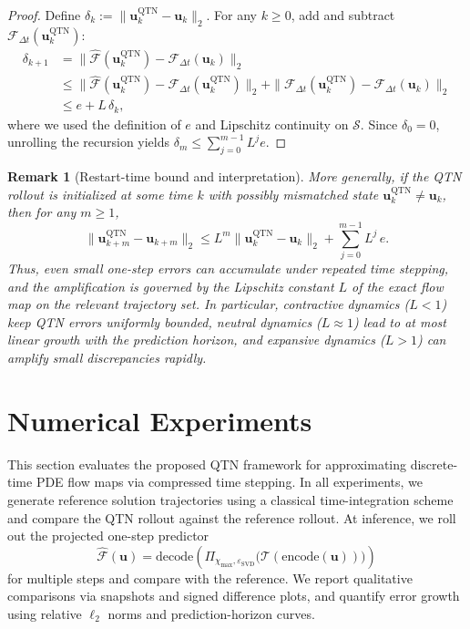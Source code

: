 \documentclass[letterpaper, 10 pt, conference]{ieeeconf}  %
\newtheorem{remark}{Remark}
\begin{document}
\begin{proof}
Define $\delta_k := \|\mathbf{u}_k^{\mathrm{QTN}} - \mathbf{u}_k\|_2$.
For any $k \ge 0$, add and subtract $\mathcal{F}_{\Delta t}(\mathbf{u}_k^{\mathrm{QTN}})$:
\begin{align*}
\delta_{k+1}
&= \|\widehat{\mathcal{F}}(\mathbf{u}_k^{\mathrm{QTN}})
      - \mathcal{F}_{\Delta t}(\mathbf{u}_k)\|_2 \\
&\le
\|\widehat{\mathcal{F}}(\mathbf{u}_k^{\mathrm{QTN}})
  - \mathcal{F}_{\Delta t}(\mathbf{u}_k^{\mathrm{QTN}})\|_2
+
\|\mathcal{F}_{\Delta t}(\mathbf{u}_k^{\mathrm{QTN}})
  - \mathcal{F}_{\Delta t}(\mathbf{u}_k)\|_2 \\
&\le e + L\,\delta_k,
\end{align*}
where we used the definition of $e$ and Lipschitz continuity on $\mathcal{S}$.
Since $\delta_0=0$, unrolling the recursion yields
$\delta_m \le \sum_{j=0}^{m-1} L^{j} e$.
\end{proof}

\begin{remark}[Restart-time bound and interpretation]
\label{rem:restart-bound}
More generally, if the QTN rollout is initialized at some time $k$ with
possibly mismatched state $\mathbf{u}_k^{\mathrm{QTN}} \neq \mathbf{u}_k$, then
for any $m\ge 1$,
\[
\|\mathbf{u}_{k+m}^{\mathrm{QTN}} - \mathbf{u}_{k+m}\|_2
\le
L^{m}\|\mathbf{u}_k^{\mathrm{QTN}} - \mathbf{u}_k\|_2
+
\sum_{j=0}^{m-1} L^{j}\, e.
\]
Thus, even small one-step errors can accumulate under repeated time stepping, and the amplification is governed by the Lipschitz constant $L$ of the exact flow map on the relevant trajectory set. In particular, contractive dynamics ($L < 1$) keep QTN errors uniformly bounded, neutral dynamics ($L \approx 1$) lead to at most linear growth with the prediction horizon, and expansive dynamics ($L > 1$) can amplify small discrepancies rapidly.

\end{remark}




\section{Numerical Experiments}
\label{sec:experiments}

This section evaluates the proposed QTN framework for approximating discrete-time
PDE flow maps via compressed time stepping. In all experiments, we generate
reference solution trajectories using a classical time-integration scheme and
compare the QTN rollout against the reference rollout. At inference, we roll out
the projected one-step predictor
\[
\widehat{\mathcal{F}}(\mathbf{u})
= \mathrm{decode}\!\left(
\Pi_{\chi_{\max},\varepsilon_{\mathrm{SVD}}}\big(
\mathcal{T}(\mathrm{encode}(\mathbf{u}))
\big)\right)
\]
for multiple steps and compare with the reference. We report qualitative
comparisons via snapshots and signed difference plots, and quantify error growth
using relative $\ell_2$ norms and prediction-horizon curves.
\end{document}
